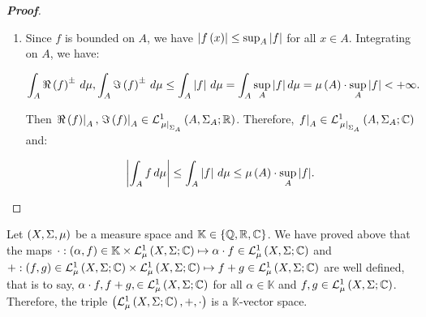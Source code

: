 \begin{proposition}
\begin{proof}[\rm\textbf{Proof}]
\begin{enumerate}
      Let $z:=\int_{X}{f\,d\mu}\in\mathbb{C}$. Then we can take $\alpha=e^{-i\cdot\text{Arg}\pr{z}}\in\mathbb{C}$ and see that $\bars{\alpha}=1$ and $\alpha\cdot z=\bars{z}$. Therefore:

      \begin{equation}
        \begin{split}
          \bars{\int_{X}{f\,d\mu}} & =\bars{\alpha}\cdot\bars{\int_{X}{f\,d\mu}}=\bars{\alpha\cdot\int_{X}{f\,d\mu}}=\bars{\int_{X}{\pr{\alpha\cdot f}\,d\mu}}\leq\int_{X}{\bars{\alpha\cdot f}\,d\mu}\\
          & =\int_{X}{\bars{f}\,d\mu}.
        \end{split}
      \end{equation}
      \item Since $f$ is bounded on $A$, we have $\bars{f\pr{x}}\leq\sup_A{\bars{f}}$ for all $x\in A$. Integrating on $A$, we have:
      
      \begin{equation}
        \int_{A}{\Re\pr{f}^{\pm}\,d\mu},\int_{A}{\Im\pr{f}^{\pm}\,d\mu}\leq\int_{A}{\bars{f}\,d\mu}=\int_{A}{\sup_{A}{\bars{f}}\,d\mu}=\mu\pr{A}\cdot\sup_{A}{\bars{f}}<+\infty.
      \end{equation}

      Then $\rest{\Re\pr{f}}{A},\rest{\Im\pr{f}}{A}\in\LebR{A}{\Sigma_A}{\rest{\mu}{\Sigma_A}}$. Therefore, $\rest{f}{A}\in\LebC{A}{\Sigma_A}{\rest{\mu}{\Sigma_A}}$ and:

      \begin{equation}
        \bars{\int_{A}{f\,d\mu}}\leq\int_{A}{\bars{f}\,d\mu}\leq\mu\pr{A}\cdot\sup_{A}{\bars{f}}.
      \end{equation}
    \end{enumerate}
  \end{proof}
\end{proposition}

\begin{remark}
  Let $\pr{X,\Sigma,\mu}$ be a measure space and $\mathbb{K}\in\set{\mathbb{Q},\mathbb{R},\mathbb{C}}$. We have proved above that the maps $\cdot:\pr{\alpha,f}\in\mathbb{K}\times\LebC{X}{\Sigma}{\mu}\mapsto\alpha\cdot f\in\LebC{X}{\Sigma}{\mu}$ and $+:\pr{f,g}\in\LebC{X}{\Sigma}{\mu}\times \LebC{X}{\Sigma}{\mu}\mapsto f+g\in\LebC{X}{\Sigma}{\mu}$ are well defined, that is to say, $\alpha\cdot f,f+g,\in\LebC{X}{\Sigma}{\mu}$ for all $\alpha\in\mathbb{K}$ and $f,g\in\LebC{X}{\Sigma}{\mu}$. Therefore, the triple $\pr{\LebC{X}{\Sigma}{\mu},+,\cdot}$ is a $\mathbb{K}$-vector space.
\end{remark}

